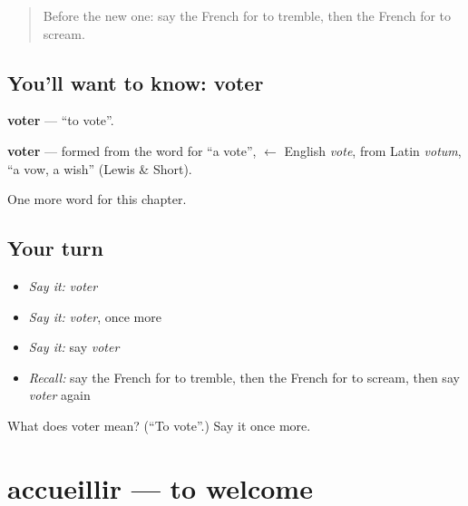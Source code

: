 \label{lesson:FR-C241-voter}



\begin{quote}
Before the new one: say the French for to tremble, then the French for to scream.
\end{quote}

\subsection*{You'll want to know: voter}
\textbf{voter} — \textquotedblleft{}to vote\textquotedblright{}.

\begin{cousinweb}
\textbf{voter} — formed from the word for \textquotedblleft{}a vote\textquotedblright{}, $\leftarrow$ English \emph{vote}, from Latin \emph{votum}, \textquotedblleft{}a vow, a wish\textquotedblright{} (Lewis \& Short).
\end{cousinweb}

\begin{grammarlens}[title={What you've built}]
One more word for this chapter.
\end{grammarlens}

\subsection*{Your turn}
\begin{itemize}
\raggedright
  \item \emph{Say it:} \emph{voter}
  \item \emph{Say it:} \emph{voter}, once more
  \item \emph{Say it:} say \emph{voter}
  \item \emph{Recall:} say the French for to tremble, then the French for to scream, then say \emph{voter} again
\end{itemize}

\begin{tcolorbox}[breakable,colback=teal!4,colframe=teal!35!black,title={Before you move on}]
What does voter mean? (\textquotedblleft{}To vote\textquotedblright{}.) Say it once more.
\end{tcolorbox}
\section[accueillir]{accueillir — to welcome}

\label{lesson:FR-C241-accueillir}



